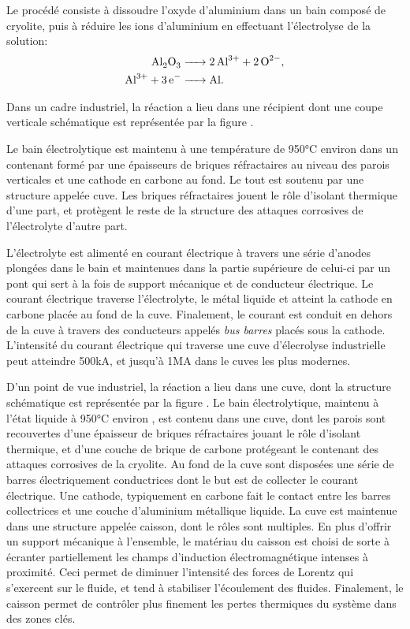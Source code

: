 
Le procédé consiste à dissoudre l'oxyde d'aluminium dans un bain
composé de cryolite, puis à réduire les ions d'aluminium en effectuant
l'électrolyse de la solution:
\begin{align}
  \cee{Al2O3 &-> 2Al^{3+} + 2O^{2-}},\\
  \cee{Al^{3+} + 3e^{-} &-> Al}.
\end{align}

Dans un cadre industriel, la réaction a lieu dans une récipient dont
une coupe verticale schématique est représentée par la figure
.

Le bain électrolytique est maintenu à une température de
\num{950}\si{\celsius} environ dans un contenant formé par une
épaisseurs de briques réfractaires au niveau des parois verticales et
une cathode en carbone au fond. Le tout est soutenu par une structure
appelée cuve. Les briques réfractaires jouent le rôle d'isolant
thermique d'une part, et protègent le reste de la structure des
attaques corrosives de l'électrolyte d'autre part.



L'électrolyte est alimenté en courant électrique à travers une série
d'anodes plongées dans le bain et maintenues dans la partie supérieure
de celui-ci par un pont qui sert à la fois de support mécanique et de
conducteur électrique. Le courant électrique traverse l'électrolyte,
le métal liquide et atteint la cathode en carbone placée au fond de la
cuve. Finalement, le courant est conduit en dehors de la cuve à
travers des conducteurs appelés {\em bus barres} placés sous la
cathode. L'intensité du courant électrique qui traverse une cuve
d'élecrolyse industrielle peut atteindre \num{500}\si{\kilo\ampere},
et jusqu'à \num{1}\si{\mega\ampere} dans le cuves les plus modernes.


D'un point de vue industriel, la réaction a lieu dans une cuve, dont
la structure schématique est représentée par la figure . Le
bain électrolytique, maintenu à l'état liquide à
\num{950}\si{\celsius} environ \needcite, est contenu dans une cuve,
dont les parois sont recouvertes d'une épaisseur de briques
réfractaires jouant le rôle d'isolant thermique, et d'une couche de
brique de carbone protégeant le contenant des attaques corrosives de
la cryolite. Au fond de la cuve sont disposées une série de barres
électriquement conductrices dont le but est de collecter le courant
électrique. Une cathode, typiquement en carbone fait le contact entre
les barres collectrices et une couche d'aluminium métallique
liquide. La cuve est maintenue dans une structure appelée caisson,
dont le rôles sont multiples. En plus d'offrir un support mécanique à
l'ensemble, le matériau du caisson est choisi de sorte à écranter
partiellement les champs d'induction électromagnétique intenses à
proximité. Ceci permet de diminuer l'intensité des forces de Lorentz
qui s'exercent sur le fluide, et tend à stabiliser l'écoulement des
fluides. Finalement, le caisson permet de contrôler plus finement les
pertes thermiques du système dans des zones clés.

